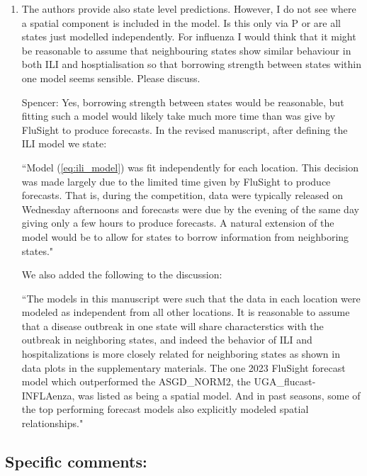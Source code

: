 \documentclass{article}
\newcommand{\spencer}[1]{{\color{blue} Spencer: #1}}
\begin{document}
\begin{enumerate}[1.]
\item The authors provide also state level predictions. However, I do not see 
where a spatial component is included in the model. Is this only via P or are 
all states just modelled independently. For influenza I would think that it 
might be reasonable to assume that neighbouring states show similar behaviour 
in both ILI and hosptialisation so that borrowing strength between states 
within one model seems sensible. Please discuss.


\spencer{Yes, borrowing strength between states would be reasonable, but 
fitting such a model would likely take much more time than was give by FluSight
to produce forecasts. In the revised manuscript, after defining the ILI model
we state:

``Model (\ref{eq:ili_model}) was fit 
independently for each location. This decision was made largely due to the 
limited time given by FluSight to produce forecasts. That is,
during the competition, data were typically released on Wednesday afternoons and
forecasts were due by the evening of the same day giving only a few hours to 
produce forecasts. A natural extension of the model would be to allow for states
to borrow information from neighboring states." 

We also added the following to the discussion:

``The models in this manuscript were such that the data in each
location were modeled as
independent from all other locations. It is reasonable to assume that a
disease outbreak in one state will share characterstics with the outbreak in 
neighboring states, and indeed the behavior of ILI and hospitalizations is more
closely related for neighboring states as shown in data plots in the
supplementary materials. The one 2023 FluSight forecast model which outperformed
the ASGD\_NORM2, the UGA\_flucast-INFLAenza, was listed as being a spatial
model. And in past seasons, some of the top performing forecast models also 
explicitly modeled spatial relationships."}

\end{enumerate}


\subsection*{Specific comments:}
\end{document}
